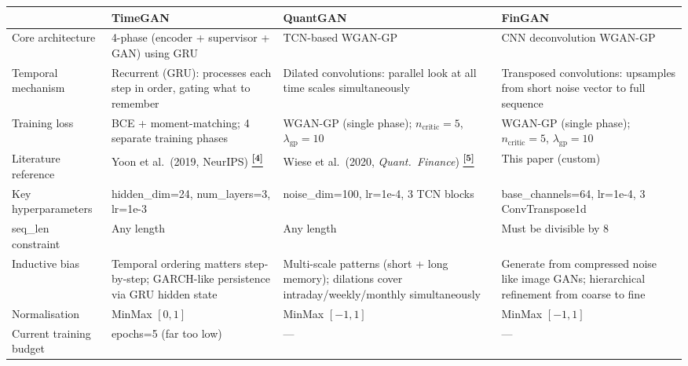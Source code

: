 \documentclass[10pt]{article}
\newcommand{\tcite}[1]{%
  \hyperlink{R:#1}{\textsuperscript{\scriptsize\textbf{[#1]}}}}
\begin{document}
\vspace{4pt}
{\small
\begin{tabularx}{\linewidth}{@{}lXXX@{}}
\toprule
 & \textbf{\textcolor{TGcol}{TimeGAN}} & \textbf{\textcolor{QGcol}{QuantGAN}} & \textbf{\textcolor{FGcol}{FinGAN}} \\
\midrule
Core architecture & 4-phase (encoder + supervisor + GAN) using GRU & TCN-based WGAN-GP & CNN deconvolution WGAN-GP \\
Temporal mechanism & Recurrent (GRU): processes each step in order, gating what to remember & Dilated convolutions: parallel look at all time scales simultaneously & Transposed convolutions: upsamples from short noise vector to full sequence \\
Training loss & BCE + moment-matching; 4 separate training phases & WGAN-GP (single phase); $n_\text{critic}=5$, $\lambda_\text{gp}=10$ & WGAN-GP (single phase); $n_\text{critic}=5$, $\lambda_\text{gp}=10$ \\
Literature reference & Yoon et al.\ (2019, NeurIPS)\tcite{4} & Wiese et al.\ (2020, \textit{Quant.\ Finance})\tcite{5} & This paper (custom) \\
Key hyperparameters & hidden\_dim=24, num\_layers=3, lr=1e-3 & noise\_dim=100, lr=1e-4, 3 TCN blocks & base\_channels=64, lr=1e-4, 3 ConvTranspose1d \\
seq\_len constraint & Any length & Any length & Must be divisible by 8 \\
Inductive bias & Temporal ordering matters step-by-step; GARCH-like persistence via GRU hidden state & Multi-scale patterns (short + long memory); dilations cover intraday/weekly/monthly simultaneously & Generate from compressed noise like image GANs; hierarchical refinement from coarse to fine \\
Normalisation & MinMax $[0,1]$ & MinMax $[-1,1]$ & MinMax $[-1,1]$ \\
Current training budget & epochs=5 (\textcolor{DRed}{far too low}) & --- & --- \\
\bottomrule
\end{tabularx}}
\end{document}
